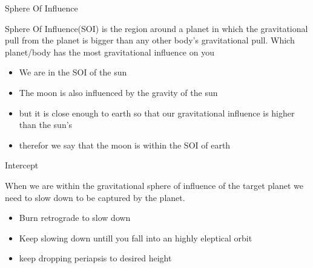 {
%
\begin{frame}
\end{frame}
\begin{frame}[t]{Sphere Of Influence}
    \begin{block}{}
    Sphere Of Influence(SOI) is the region around a planet in which the gravitational pull from the planet is bigger than
    any other body's gravitational pull. Which planet/body has the most gravitational influence on you
    \begin{itemize}
        \item We are in the SOI of the sun
        \item The moon is also influenced by the gravity of the sun
        \item but it is close enough to earth so that our gravitational influence is higher than the sun's
        \item therefor we say that the moon is within the SOI of earth
    \end{itemize}
    \end{block}
\end{frame}
\begin{frame}[t]{Intercept}
    \begin{block}{}
        When we are within the gravitational sphere of influence of the target planet we need to slow down to be
        captured by the planet.
        \begin{itemize}
            \item Burn retrograde to slow down
            \item Keep slowing down untill you fall into an highly eleptical orbit
            \item keep dropping periapsis to desired height

\end{itemize}
\end{block}
\end{frame}}
